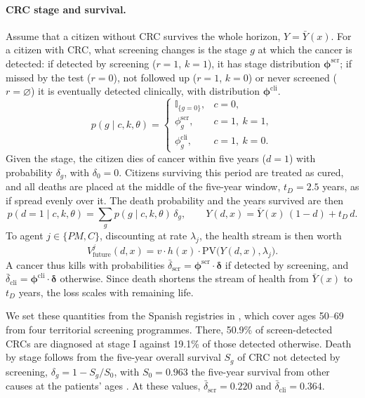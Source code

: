 \documentclass[12pt]{article}
\begin{document}
\paragraph{CRC stage and survival.} Assume that a citizen without CRC survives the whole horizon, $Y = \bar Y(x)$. For a citizen with CRC, what screening changes is the stage $g$ at which the cancer is detected:  if detected by screening ($r = 1$, $k = 1$), it has stage distribution $\boldsymbol{\phi}^{\text{scr}}$; if missed by the test ($r=0$), not followed up ($r = 1$, $k = 0$) or never screened ($r = \varnothing$) it is eventually detected clinically, with distribution $\boldsymbol{\phi}^{\text{cli}}$.
\begin{equation}\label{eq:stage}
p(g \mid c, k, \theta) =
\begin{cases}
\mathbb{I}_{\{g = 0\}}, & c = 0,\\
\phi^{\text{scr}}_g, & c = 1,\ k = 1,\\
\phi^{\text{cli}}_g, & c = 1,\ k = 0.
\end{cases}
\end{equation}
Given the stage, the citizen dies of cancer within five years ($d=1$) with probability $\delta_g$, with $\delta_0 = 0$. Citizens surviving this period are treated as cured, and all deaths are placed at the middle of the five-year window, $t_D=2.5$ years, as if spread evenly over it. The death probability and the years survived are then
\begin{equation}\label{eq:qdeath}
p(d = 1 \mid c, k, \theta) = \sum_{g} p(g \mid c, k, \theta)\, \delta_g,
\qquad
Y(d,x) = \bar Y(x)\,(1 - d) + t_D\, d .
\end{equation}
To agent $j \in \{PM, C\}$, discounting at rate $\lambda_j$, the health stream is then worth
\begin{equation}\label{eq:vfuture}
V^{j}_{\text{future}}(d, x) = v \cdot h(x) \cdot \mathrm{PV}\big(Y(d,x), \lambda_j\big).
\end{equation}
A cancer thus kills with probabilities $\bar\delta_{\text{scr}} = \boldsymbol{\phi}^{\text{scr}} \cdot \boldsymbol{\delta}$ if detected by screening, and $\bar\delta_{\text{cli}} = \boldsymbol{\phi}^{\text{cli}} \cdot \boldsymbol{\delta}$ otherwise. Since death shortens the stream of health from $\bar Y(x)$ to $t_D$ years, the loss scales with remaining life.

We set these quantities from the Spanish registries in \citet{cardoso2022overall}, which cover ages 50--69 from four territorial screening programmes. There, 50.9\% of screen-detected CRCs are diagnosed at stage I against 19.1\% of those detected otherwise. Death by stage follows from the five-year overall survival $S_g$ of CRC not detected by screening, $\delta_g = 1 - S_g/S_0$, with $S_0 = 0.963$ the five-year survival from other causes at the patients' ages \citep{ine2024mortalidad}. At these values, $\bar\delta_{\text{scr}} = 0.220$ and $\bar\delta_{\text{cli}} = 0.364$.
\end{document}
